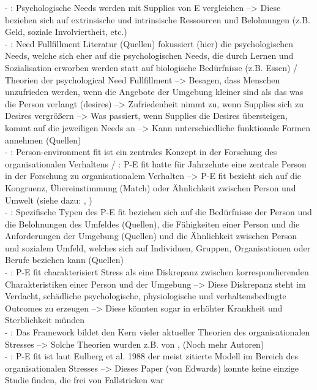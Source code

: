 - \cite[S. 2]{edwards:2004}: Psychologische Needs werden mit Supplies von E vergleichen --> Diese beziehen sich auf extrinsische und intrinsische Ressourcen und Belohnungen (z.B. Geld, soziale Involviertheit, etc.) \\
- \cite[S. 2]{edwards:2004}: Need Fullfillment Literatur (Quellen) fokussiert (hier) die psychologischen Needs, welche sich eher auf die psychologischen Needs, die durch Lernen und Sozialisation erworben werden statt auf biologische Bedürfnisse (z.B. Essen) / Theorien der psychological Need Fullfillment --> Besagen, dass Menschen unzufrieden werden, wenn die Angebote der Umgebung kleiner sind als das was die Person verlangt (desires) --> Zufriedenheit nimmt zu, wenn Supplies sich zu Desires vergrößern --> Was passiert, wenn Supplies die Desires übersteigen, kommt auf die jeweiligen Needs an --> Kann unterschiedliche funktionale Formen annehmen (Quellen)\\
- \cite[S. 1]{edwards:2008}: Person-environment fit ist ein zentrales Konzept in der Forschung des organisationalen Verhaltens / \cite[S. 2]{edwards:2008}: P-E fit hatte für Jahrzehnte eine zentrale Person in der Forschung zu organisationalem Verhalten --> P-E fit bezieht sich auf die Kongruenz, Übereinstimmung (Match) oder Ähnlichkeit zwischen Person und Umwelt (siehe dazu: \cite{edwards:1998}, \cite{muchinsky:1987})\\
- \cite[S. 2]{edwards:2008}: Spezifische Typen des P-E fit beziehen sich auf die Bedürfnisse der Person und die Belohnungen des Umfeldes (Quellen), die Fähigkeiten einer Person und die Anforderungen der Umgebung (Quellen) und die Ähnlichkeit zwischen Person und sozialem Umfeld, welches sich auf Individuen, Gruppen, Organisationen oder Berufe beziehen kann (Quellen) \\
- \cite[S. 1]{edwards:1990}: P-E fit charakterisiert Stress als eine Diskrepanz zwischen korrespondierenden Charakteristiken einer Person und der Umgebung --> Diese Diskrepanz steht im Verdacht, schädliche psychologische, physiologische und verhaltensbedingte Outcomes zu erzeugen --> Diese könnten sogar in erhöhter Krankheit und Sterblichkeit münden \\
- \cite[S. 1]{edwards:1990}: Das Framework bildet den Kern vieler aktueller Theorien des organisationalen Stresses  --> Solche Theorien wurden z.B. von \textcite{copingAndAdaption:1974}, \textcite{mechanismsOfJobStressAndStrain:1982} (Noch mehr Autoren) \\
- \cite[S. 2]{edwards:1990}: P-E fit ist laut Eulberg et al. 1988 der meist zitierte Modell im Bereich des organisationalen Stresses --> Dieses Paper (von Edwards) konnte keine einzige Studie finden, die frei von Fallstricken war \\
